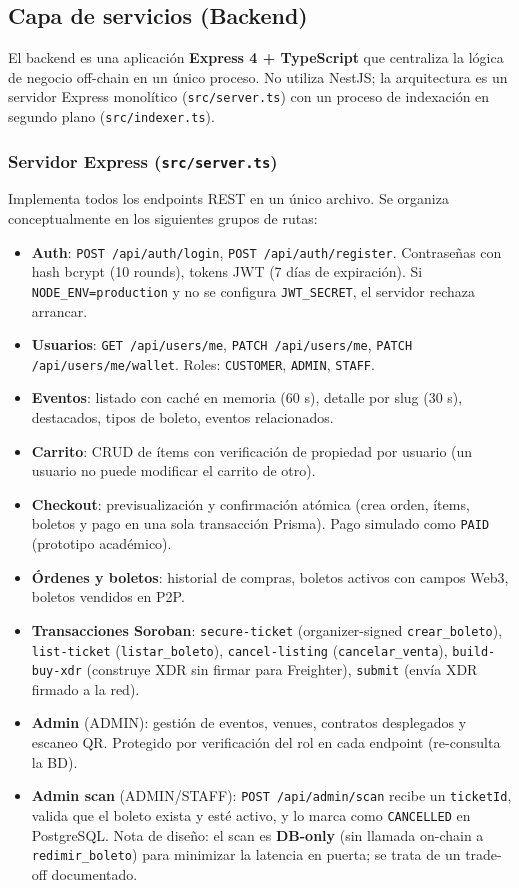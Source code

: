\documentclass[12pt,oneside]{article}
\begin{document}
\subsection{Capa de servicios (Backend)}

El backend es una aplicación \textbf{Express 4 + TypeScript} que centraliza la lógica de negocio off-chain en un único proceso. No utiliza NestJS; la arquitectura es un servidor Express monolítico (\texttt{src/server.ts}) con un proceso de indexación en segundo plano (\texttt{src/indexer.ts}).

\subsubsection{Servidor Express (\texttt{src/server.ts})}

Implementa todos los endpoints REST en un único archivo. Se organiza conceptualmente en los siguientes grupos de rutas:

\begin{itemize}
  \item \textbf{Auth}: \texttt{POST /api/auth/login}, \texttt{POST /api/auth/register}. Contraseñas con hash bcrypt (10 rounds), tokens JWT (7 días de expiración). Si \texttt{NODE\_ENV=production} y no se configura \texttt{JWT\_SECRET}, el servidor rechaza arrancar.
  \item \textbf{Usuarios}: \texttt{GET /api/users/me}, \texttt{PATCH /api/users/me}, \texttt{PATCH /api/users/me/wallet}. Roles: \texttt{CUSTOMER}, \texttt{ADMIN}, \texttt{STAFF}.
  \item \textbf{Eventos}: listado con caché en memoria (60 s), detalle por slug (30 s), destacados, tipos de boleto, eventos relacionados.
  \item \textbf{Carrito}: CRUD de ítems con verificación de propiedad por usuario (un usuario no puede modificar el carrito de otro).
  \item \textbf{Checkout}: previsualización y confirmación atómica (crea orden, ítems, boletos y pago en una sola transacción Prisma). Pago simulado como \texttt{PAID} (prototipo académico).
  \item \textbf{Órdenes y boletos}: historial de compras, boletos activos con campos Web3, boletos vendidos en P2P.
  \item \textbf{Transacciones Soroban}: \texttt{secure-ticket} (organizer-signed \texttt{crear\_boleto}), \texttt{list-ticket} (\texttt{listar\_boleto}), \texttt{cancel-listing} (\texttt{cancelar\_venta}), \texttt{build-buy-xdr} (construye XDR sin firmar para Freighter), \texttt{submit} (envía XDR firmado a la red).
  \item \textbf{Admin} (ADMIN): gestión de eventos, venues, contratos desplegados y escaneo QR. Protegido por verificación del rol en cada endpoint (re-consulta la BD).
  \item \textbf{Admin scan} (ADMIN/STAFF): \texttt{POST /api/admin/scan} recibe un \texttt{ticketId}, valida que el boleto exista y esté activo, y lo marca como \texttt{CANCELLED} en PostgreSQL. Nota de diseño: el scan es \textbf{DB-only} (sin llamada on-chain a \texttt{redimir\_boleto}) para minimizar la latencia en puerta; se trata de un trade-off documentado.
\end{itemize}
\end{document}
